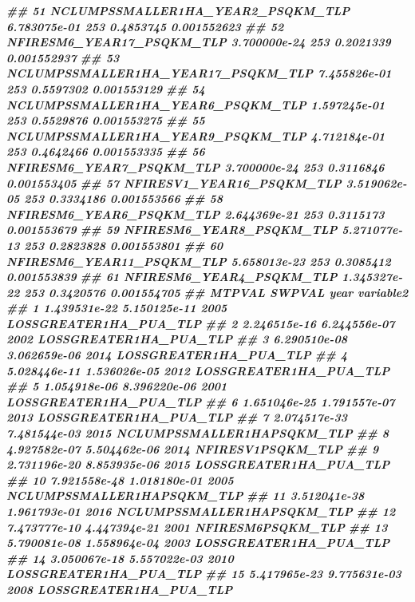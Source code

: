 \documentclass[10pt,landscape,a3paper]{article}
\newenvironment{Shaded}{\begin{snugshade}}{\end{snugshade}}
\newcommand{\DocumentationTok}[1]{\textcolor[rgb]{0.56,0.35,0.01}{\textbf{\textit{#1}}}}
\begin{document}
\begin{Shaded}
\begin{Highlighting}[]
\DocumentationTok{\#\# 51  NCLUMPSSMALLER1HA\_YEAR2\_PSQKM\_TLP 6.783075e{-}01    253 0.4853745 0.001552623}
\DocumentationTok{\#\# 52          NFIRESM6\_YEAR17\_PSQKM\_TLP 3.700000e{-}24    253 0.2021339 0.001552937}
\DocumentationTok{\#\# 53 NCLUMPSSMALLER1HA\_YEAR17\_PSQKM\_TLP 7.455826e{-}01    253 0.5597302 0.001553129}
\DocumentationTok{\#\# 54  NCLUMPSSMALLER1HA\_YEAR6\_PSQKM\_TLP 1.597245e{-}01    253 0.5529876 0.001553275}
\DocumentationTok{\#\# 55  NCLUMPSSMALLER1HA\_YEAR9\_PSQKM\_TLP 4.712184e{-}01    253 0.4642466 0.001553335}
\DocumentationTok{\#\# 56           NFIRESM6\_YEAR7\_PSQKM\_TLP 3.700000e{-}24    253 0.3116846 0.001553405}
\DocumentationTok{\#\# 57          NFIRESV1\_YEAR16\_PSQKM\_TLP 3.519062e{-}05    253 0.3334186 0.001553566}
\DocumentationTok{\#\# 58           NFIRESM6\_YEAR6\_PSQKM\_TLP 2.644369e{-}21    253 0.3115173 0.001553679}
\DocumentationTok{\#\# 59           NFIRESM6\_YEAR8\_PSQKM\_TLP 5.271077e{-}13    253 0.2823828 0.001553801}
\DocumentationTok{\#\# 60          NFIRESM6\_YEAR11\_PSQKM\_TLP 5.658013e{-}23    253 0.3085412 0.001553839}
\DocumentationTok{\#\# 61           NFIRESM6\_YEAR4\_PSQKM\_TLP 1.345327e{-}22    253 0.3420576 0.001554705}
\DocumentationTok{\#\#          MTPVAL       SWPVAL year                  variable2}
\DocumentationTok{\#\# 1  1.439531e{-}22 5.150125e{-}11 2005     LOSSGREATER1HA\_PUA\_TLP}
\DocumentationTok{\#\# 2  2.246515e{-}16 6.244556e{-}07 2002     LOSSGREATER1HA\_PUA\_TLP}
\DocumentationTok{\#\# 3  6.290510e{-}08 3.062659e{-}06 2014     LOSSGREATER1HA\_PUA\_TLP}
\DocumentationTok{\#\# 4  5.028446e{-}11 1.536026e{-}05 2012     LOSSGREATER1HA\_PUA\_TLP}
\DocumentationTok{\#\# 5  1.054918e{-}06 8.396220e{-}06 2001     LOSSGREATER1HA\_PUA\_TLP}
\DocumentationTok{\#\# 6  1.651046e{-}25 1.791557e{-}07 2013     LOSSGREATER1HA\_PUA\_TLP}
\DocumentationTok{\#\# 7  2.074517e{-}33 7.481544e{-}03 2015 NCLUMPSSMALLER1HAPSQKM\_TLP}
\DocumentationTok{\#\# 8  4.927582e{-}07 5.504462e{-}06 2014          NFIRESV1PSQKM\_TLP}
\DocumentationTok{\#\# 9  2.731196e{-}20 8.853935e{-}06 2015     LOSSGREATER1HA\_PUA\_TLP}
\DocumentationTok{\#\# 10 7.921558e{-}48 1.018180e{-}01 2005 NCLUMPSSMALLER1HAPSQKM\_TLP}
\DocumentationTok{\#\# 11 3.512041e{-}38 1.961793e{-}01 2016 NCLUMPSSMALLER1HAPSQKM\_TLP}
\DocumentationTok{\#\# 12 7.473777e{-}10 4.447394e{-}21 2001          NFIRESM6PSQKM\_TLP}
\DocumentationTok{\#\# 13 5.790081e{-}08 1.558964e{-}04 2003     LOSSGREATER1HA\_PUA\_TLP}
\DocumentationTok{\#\# 14 3.050067e{-}18 5.557022e{-}03 2010     LOSSGREATER1HA\_PUA\_TLP}
\DocumentationTok{\#\# 15 5.417965e{-}23 9.775631e{-}03 2008     LOSSGREATER1HA\_PUA\_TLP}

\end{Highlighting}
\end{Shaded}
\end{document}
